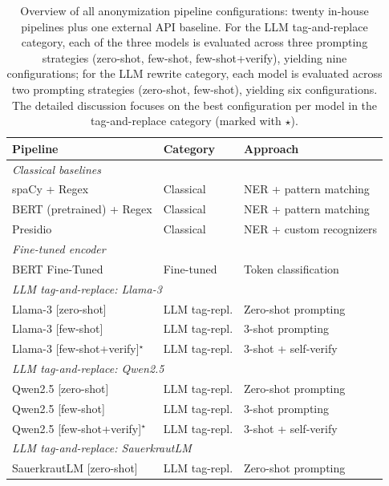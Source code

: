 \begin{table}[htbp]
\centering
\caption{Overview of all anonymization pipeline configurations: twenty
in-house pipelines plus one external API baseline. For the LLM
tag-and-replace category, each of the three models is evaluated across
three prompting strategies (zero-shot, few-shot, few-shot+verify),
yielding nine configurations; for the LLM rewrite category, each model
is evaluated across two prompting strategies (zero-shot, few-shot),
yielding six configurations. The detailed discussion focuses on the
best configuration per model in the tag-and-replace category (marked
with $\star$).}
\label{tab:pipeline_overview}
\small
\begin{tabular}{lll}
\toprule
\textbf{Pipeline} & \textbf{Category} & \textbf{Approach} \\
\midrule
\multicolumn{3}{l}{\textit{Classical baselines}} \\
spaCy + Regex                          & Classical      & NER + pattern matching \\
BERT (pretrained) + Regex              & Classical      & NER + pattern matching \\
Presidio                               & Classical      & NER + custom recognizers \\
\midrule
\multicolumn{3}{l}{\textit{Fine-tuned encoder}} \\
BERT Fine-Tuned                        & Fine-tuned     & Token classification \\
\midrule
\multicolumn{3}{l}{\textit{LLM tag-and-replace: Llama-3}} \\
Llama-3 [zero-shot]                    & LLM tag-repl.  & Zero-shot prompting \\
Llama-3 [few-shot]                     & LLM tag-repl.  & 3-shot prompting \\
Llama-3 [few-shot+verify]$^\star$      & LLM tag-repl.  & 3-shot + self-verify \\
\midrule
\multicolumn{3}{l}{\textit{LLM tag-and-replace: Qwen2.5}} \\
Qwen2.5 [zero-shot]                    & LLM tag-repl.  & Zero-shot prompting \\
Qwen2.5 [few-shot]                     & LLM tag-repl.  & 3-shot prompting \\
Qwen2.5 [few-shot+verify]$^\star$      & LLM tag-repl.  & 3-shot + self-verify \\
\midrule
\multicolumn{3}{l}{\textit{LLM tag-and-replace: SauerkrautLM}} \\
SauerkrautLM [zero-shot]               & LLM tag-repl.  & Zero-shot prompting \\

\end{tabular}
\end{table}
